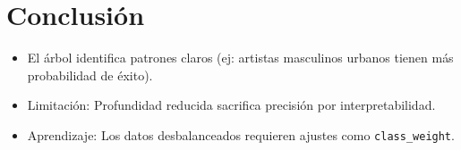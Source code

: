 \documentclass{article}
\begin{document}
\section{Conclusión}
\begin{itemize}
    \item El árbol identifica patrones claros (ej: artistas masculinos urbanos tienen más probabilidad de éxito).
    \item Limitación: Profundidad reducida sacrifica precisión por interpretabilidad.
    \item Aprendizaje: Los datos desbalanceados requieren ajustes como \texttt{class\_weight}.
\end{itemize}
\end{document}
